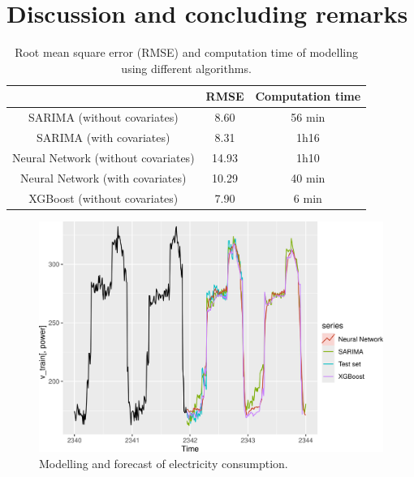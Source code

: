 \section{Discussion and concluding remarks}
\begin{table}[H]
\centering \begin{tabular}{c|cc}
                                    & RMSE & Computation time\\\hline\hline
SARIMA (without covariates)         &  8.60 &  56 min \\
SARIMA (with covariates)            &  8.31 &  1h16   \\
Neural Network (without covariates) & 14.93 &  1h10   \\
Neural Network (with covariates)    & 10.29 &  40 min \\
XGBoost (without covariates)        & 7.90  &  6 min
\end{tabular}
\caption{Root mean square error (RMSE) and computation time of modelling using different algorithms.}
\label{table_discussion}
\end{table}

\begin{figure}[!h]
\centering
 \includegraphics[scale=0.6]{figures/figure_discussion.png}
\caption{Modelling and forecast of electricity consumption.}
\label{figure_discussion}
\end{figure}

